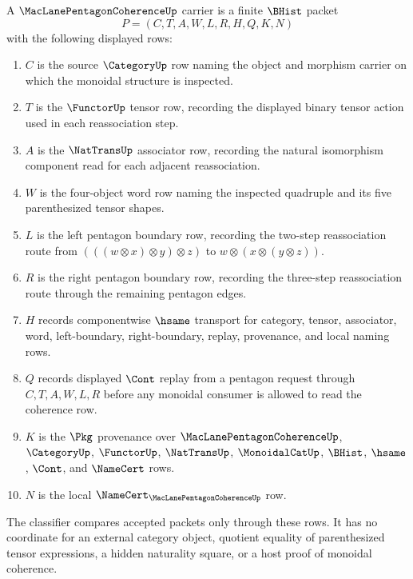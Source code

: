 \begin{definition}
\label{def:maclane-pentagon-coherence-carrier}
A $\MacLanePentagonCoherenceUp$ carrier is a finite $\BHist$ packet
$$
P=(C,T,A,W,L,R,H,Q,K,N)
$$
with the following displayed rows:
\begin{enumerate}
\item $C$ is the source $\CategoryUp$ row naming the object and morphism carrier on which the monoidal structure is inspected.
\item $T$ is the $\FunctorUp$ tensor row, recording the displayed binary tensor action used in each reassociation step.
\item $A$ is the $\NatTransUp$ associator row, recording the natural isomorphism component read for each adjacent reassociation.
\item $W$ is the four-object word row naming the inspected quadruple and its five parenthesized tensor shapes.
\item $L$ is the left pentagon boundary row, recording the two-step reassociation route from $(((w\otimes x)\otimes y)\otimes z)$ to $w\otimes(x\otimes(y\otimes z))$.
\item $R$ is the right pentagon boundary row, recording the three-step reassociation route through the remaining pentagon edges.
\item $H$ records componentwise $\hsame$ transport for category, tensor, associator, word, left-boundary, right-boundary, replay, provenance, and local naming rows.
\item $Q$ records displayed $\Cont$ replay from a pentagon request through $C,T,A,W,L,R$ before any monoidal consumer is allowed to read the coherence row.
\item $K$ is the $\Pkg$ provenance over $\MacLanePentagonCoherenceUp$, $\CategoryUp$, $\FunctorUp$, $\NatTransUp$, $\MonoidalCatUp$, $\BHist$, $\hsame$, $\Cont$, and $\NameCert$ rows.
\item $N$ is the local $\NameCert_{\MacLanePentagonCoherenceUp}$ row.
\end{enumerate}
The classifier compares accepted packets only through these rows. It has no coordinate for an external category object, quotient equality of parenthesized tensor expressions, a hidden naturality square, or a host proof of monoidal coherence.
\end{definition}

